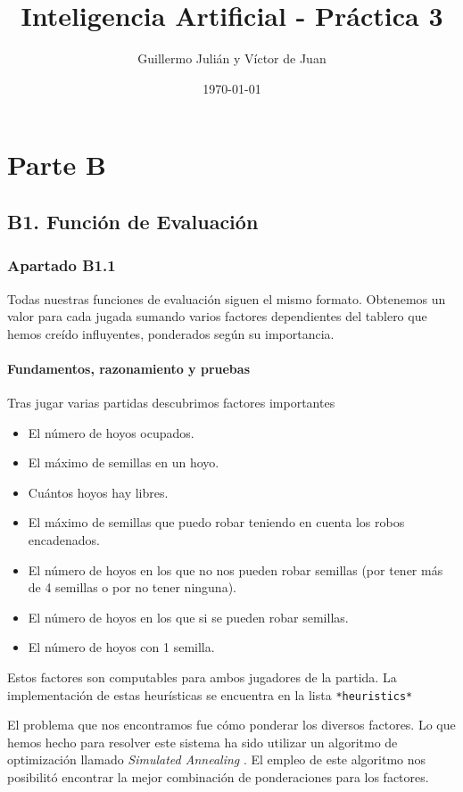\documentclass{apuntes}
\author{Guillermo Julián y Víctor de Juan}
\date{\today}
\title{Inteligencia Artificial - Práctica 3}
\begin{document}
\maketitle

\chapter*{Parte B}
\section*{B1. Función de Evaluación}
\subsection*{Apartado B1.1}

Todas nuestras funciones de evaluación siguen el mismo formato. Obtenemos un valor para cada jugada sumando varios factores dependientes del tablero que hemos creído influyentes, ponderados según su importancia.

\subsubsection*{Fundamentos, razonamiento y pruebas}
Tras jugar varias partidas descubrimos factores importantes

\begin{itemize}
\item El número de hoyos ocupados.
\item El máximo de semillas en un hoyo.
\item Cuántos hoyos hay libres.
\item El máximo de semillas que puedo robar teniendo en cuenta los robos encadenados.
\item El número de hoyos en los que no nos pueden robar semillas (por tener más de 4 semillas o por no tener ninguna).
\item El número de hoyos en los que si se pueden robar semillas.
\item El número de hoyos con 1 semilla.
\end{itemize}

Estos factores son computables para ambos jugadores de la partida. La implementación de estas heurísticas se encuentra en la lista \texttt{*heuristics*}

El problema que nos encontramos fue cómo ponderar los diversos factores. Lo que hemos hecho para resolver este sistema ha sido utilizar un algoritmo de optimización llamado \textit{Simulated Annealing} \citep{kirkpatrick83}. El empleo de este algoritmo nos posibilitó encontrar la mejor combinación de ponderaciones para los factores.
\end{document}
